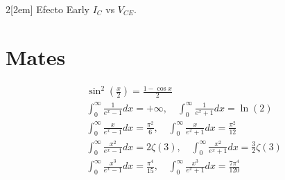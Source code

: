 \documentclass[leqno]{article}
\begin{document}
\begin{multicols}{2}[\columnsep2em]
Efecto Early $I_C$ vs $V_{CE}$. 







\section{Mates}
\begin{align*}
&\sin^2 \left(\frac{x}{2}\right) = \frac{1-\cos x}{2}\\
&\int_0^\infty \frac{1}{e^x-1}dx = +\infty, \quad \int_0^\infty \frac{1}{e^x+1}dx = \ln(2)\\
&\int_0^\infty \frac{x}{e^x-1}dx = \frac{\pi^2}{6}, \quad \int_0^\infty \frac{x}{e^x+1}dx = \frac{\pi^2}{12} \\
&\int_0^\infty \frac{x^2}{e^x-1}dx = 2\zeta(3), \quad \int_0^\infty \frac{x^2}{e^x+1}dx = \frac{3}{2}\zeta(3)\\
&\int_0^\infty \frac{x^3}{e^x-1}dx = \frac{\pi^4}{15}, \quad \int_0^\infty \frac{x^3}{e^x+1}dx = \frac{7\pi^4}{120} 
\end{align*}

\end{multicols}
\end{document}
